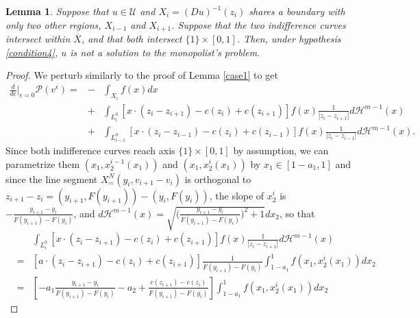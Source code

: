 \documentclass[12pt,reqno]{amsart}
\newtheorem{lem}{Lemma}
\begin{document}
\begin{lem}\label{case2} Suppose that $u \in \mathcal{U}$ and $X_i =(Du)^{-1}(z_i)$ shares a boundary with only two other regions, $X_{i-1}$ and $X_{i+1}$.  Suppose that the two indifference curves intersect within $\overline{X}$, and that both intersect $\{1\} \times [0,1]$.  Then, under hypothesis  \ref{condition4}, $u$ is not a solution to the monopolist's problem.   
\end{lem}
\begin{proof}
    We perturb similarly to the proof of Lemma \ref{case1} to get 
    \begin{eqnarray}\label{optcond2}
         \frac{d}{d\epsilon}\Big|_{\epsilon=0} \mathcal P(v^\epsilon)  =
         &-&\int_{X_i}f(x)dx\label{derivative2} \\
      &+&\int_{L^0_{i}}[x \cdot (z_{i}-z_{i+1})-c(z_{i}) +c(z_{i+1}) ]f(x)\frac{1}{|z_i-z_{i+1}|}d\mathcal H^{m-1}(x) \nonumber\\
&+&     \int_{L^0_{i-1}}[x \cdot (z_{i}-z_{i-1})-c(z_i) + c(z_{i-1}) ]f(x)\frac{1}{|z_i-z_{i-1}|}d\mathcal H^{m-1}(x). \nonumber
\end{eqnarray}
    Since both indifference curves reach axis $\{1\} \times [0,1]$ by assumption, we can parametrize them  $(x_1,x^{i-1}_2(x_1))$ and $(x_1,x^i_2(x_1))$ by $x_ 1 \in [1-a_1,1]$ and since the line segment $X^N_=(y_i, v_{i+1} - v_{i})$ is orthogonal to $z_{i+1}-z_i =( y_{i+1},F(y_{i+1})) -(y_{i},F(y_{i})) $, the slope of $x_2^i$ is $-\frac{y_{i+1} -y_i}{F(y_{i+1})-F(y_i)}$, and  $d\mathcal H^{m-1}(x) = \sqrt{\big(\frac{y_{i+1} -y_i}{F(y_{i+1})-F(y_i)}\big)^2+1}dx_2$, so that  
    \begin{eqnarray*}
&&\int_{L_i^0}[x \cdot (z_{i}-z_{i+1})-c(z_{i}) +c(z_{i+1}) ]f(x)\frac{1}{|z_i-z_{i+1}|}d\mathcal H^{m-1}(x)\\
&=&[a \cdot (z_{i}-z_{i+1})-c(z_{i}) +c(z_{i+1}) ]\frac{1}{F(y_{i+1})-F(y_{i})}\int_{1-a_1}^{1} f(x_1,x^i_2(x_1))dx_2\\
&=& [-a_1\frac{y_{i+1} -y_i}{F(y_{i+1})-F(y_i)} -a_2  +\frac{c(z_{i+1}) -c(z_{i})}{F(y_{i+1})-F(y_{i})}]\int_{1-a_1}^{1} f(x_1,x^i_2(x_1))dx_2
\end{eqnarray*}


\end{proof}
\end{document}
